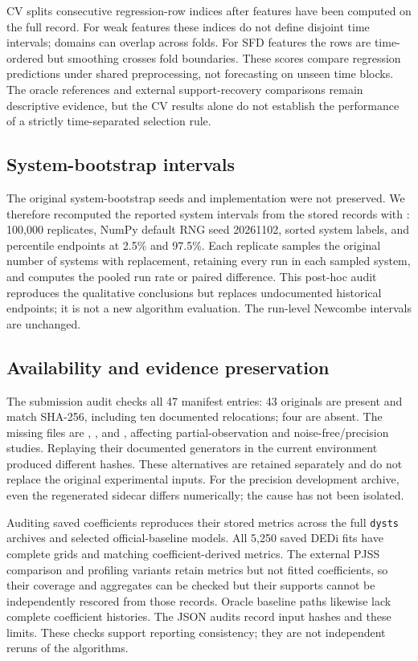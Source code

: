 CV splits consecutive regression-row indices after features have been computed on the full record. For weak features these indices do not define disjoint time intervals; domains can overlap across folds. For SFD features the rows are time-ordered but smoothing crosses fold boundaries. These scores compare regression predictions under shared preprocessing, not forecasting on unseen time blocks. The oracle references and external support-recovery comparisons remain descriptive evidence, but the CV results alone do not establish the performance of a strictly time-separated selection rule.

\subsection{System-bootstrap intervals}
\label{app:bootstrap}
The original system-bootstrap seeds and implementation were not preserved. We therefore recomputed the reported system intervals from the stored records with : 100{,}000 replicates, NumPy default RNG seed 20261102, sorted system labels, and percentile endpoints at 2.5\% and 97.5\%. Each replicate samples the original number of systems with replacement, retaining every run in each sampled system, and computes the pooled run rate or paired difference. This post-hoc audit reproduces the qualitative conclusions but replaces undocumented historical endpoints; it is not a new algorithm evaluation. The run-level Newcombe intervals are unchanged.

\subsection{Availability and evidence preservation}
\label{app:data-audit}
The submission audit checks all 47 manifest entries: 43 originals are present and match SHA-256, including ten documented relocations; four are absent. The missing files are , ,  and , affecting partial-observation and noise-free/precision studies. Replaying their documented generators in the current environment produced different hashes. These alternatives are retained separately and do not replace the original experimental inputs. For the precision development archive, even the regenerated sidecar differs numerically; the cause has not been isolated.

Auditing saved coefficients reproduces their stored metrics across the full \texttt{dysts} archives and selected official-baseline models. All 5{,}250 saved DEDi fits have complete grids and matching coefficient-derived metrics. The external PJSS comparison and profiling variants retain metrics but not fitted coefficients, so their coverage and aggregates can be checked but their supports cannot be independently rescored from those records. Oracle baseline paths likewise lack complete coefficient histories. The JSON audits record input hashes and these limits. These checks support reporting consistency; they are not independent reruns of the algorithms.
